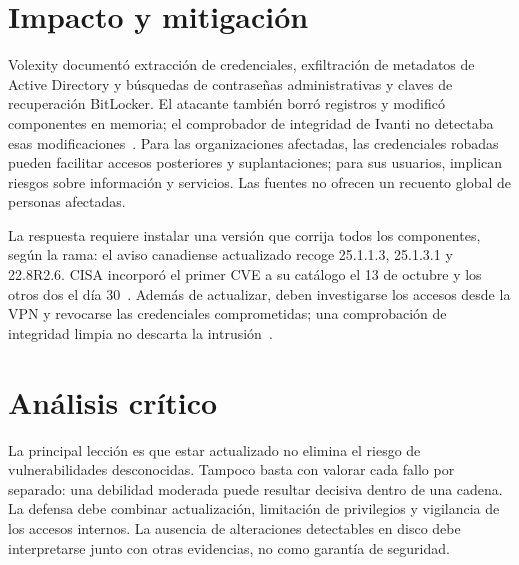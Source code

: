 \section{Impacto y mitigación}
Volexity documentó extracción de credenciales, exfiltración
de metadatos de Active Directory y búsquedas de contraseñas
administrativas y claves de recuperación BitLocker.
El atacante también borró registros y modificó componentes
en memoria; el comprobador de integridad de Ivanti no
detectaba esas modificaciones~\cite{volexity2026ivanti}.
Para las organizaciones afectadas, las credenciales robadas
pueden facilitar accesos posteriores y suplantaciones; para
sus usuarios, implican riesgos sobre información y servicios.
Las fuentes no ofrecen un recuento global de personas
afectadas.

La respuesta requiere instalar una versión que corrija
todos los componentes, según la rama: el aviso canadiense
actualizado recoge 25.1.1.3, 25.1.3.1 y 22.8R2.6.
CISA incorporó el primer CVE a su catálogo el 13 de octubre
y los otros dos el día 30~\cite{canada2026ivanti}.
Además de actualizar, deben investigarse los accesos
desde la VPN y revocarse las credenciales comprometidas;
una comprobación de integridad limpia no descarta la
intrusión~\cite{volexity2026ivanti}.

\section{Análisis crítico}
La principal lección es que estar actualizado no elimina
el riesgo de vulnerabilidades desconocidas. Tampoco basta
con valorar cada fallo por separado: una debilidad moderada
puede resultar decisiva dentro de una cadena.
La defensa debe combinar actualización, limitación de
privilegios y vigilancia de los accesos internos.
La ausencia de alteraciones detectables en disco debe
interpretarse junto con otras evidencias, no como garantía
de seguridad.